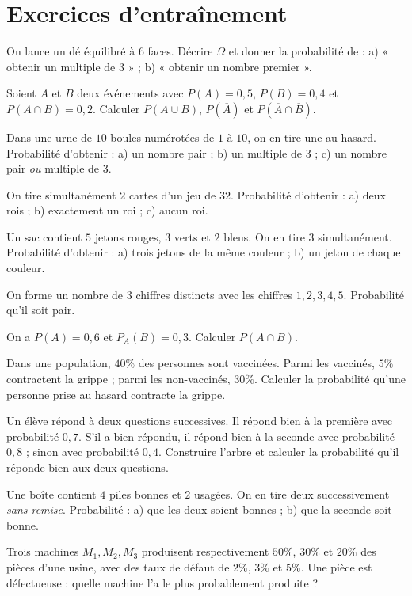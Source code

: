 \section{Exercices d'entraînement}

\exo{} On lance un dé équilibré à $6$ faces. Décrire $\Omega$ et donner la
probabilité de : a) « obtenir un multiple de $3$ » ; b) « obtenir un nombre
premier ».

\exo{} Soient $A$ et $B$ deux événements avec $P(A)=0{,}5$, $P(B)=0{,}4$ et
$P(A\cap B)=0{,}2$. Calculer $P(A\cup B)$, $P(\overline A)$ et $P(\overline A\cap\overline B)$.

\exo{} Dans une urne de $10$ boules numérotées de $1$ à $10$, on en tire
une au hasard. Probabilité d'obtenir : a) un nombre pair ; b) un multiple de $3$ ;
c) un nombre pair \emph{ou} multiple de $3$.

\exo{} On tire simultanément $2$ cartes d'un jeu de $32$. Probabilité
d'obtenir : a) deux rois ; b) exactement un roi ; c) aucun roi.

\exo{} Un sac contient $5$ jetons rouges, $3$ verts et $2$ bleus. On en
tire $3$ simultanément. Probabilité d'obtenir : a) trois jetons de la même
couleur ; b) un jeton de chaque couleur.

\exo{} On forme un nombre de $3$ chiffres distincts avec les chiffres
$1,2,3,4,5$. Probabilité qu'il soit pair.

\exo{} On a $P(A)=0{,}6$ et $P_A(B)=0{,}3$. Calculer $P(A\cap B)$.

\exo{} Dans une population, $40\%$ des personnes sont vaccinées. Parmi les
vaccinés, $5\%$ contractent la grippe ; parmi les non-vaccinés, $30\%$. Calculer
la probabilité qu'une personne prise au hasard contracte la grippe.

\exo{} Un élève répond à deux questions successives. Il répond bien à la
première avec probabilité $0{,}7$. S'il a bien répondu, il répond bien à la seconde
avec probabilité $0{,}8$ ; sinon avec probabilité $0{,}4$. Construire l'arbre et
calculer la probabilité qu'il réponde bien aux deux questions.

\exo{} Une boîte contient $4$ piles bonnes et $2$ usagées. On en tire deux
successivement \emph{sans remise}. Probabilité : a) que les deux soient bonnes ;
b) que la seconde soit bonne.

\exo{} Trois machines $M_1,M_2,M_3$ produisent respectivement $50\%$,
$30\%$ et $20\%$ des pièces d'une usine, avec des taux de défaut de $2\%$, $3\%$
et $5\%$. Une pièce est défectueuse : quelle machine l'a le plus probablement
produite ?

